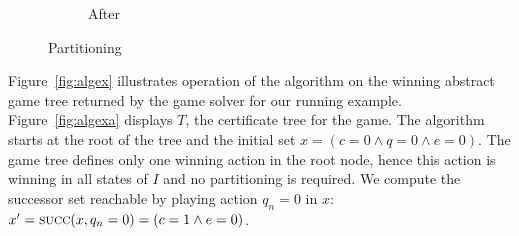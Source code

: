 \begin{figure}[b]
\begin{subfigure}[t]{.3\textwidth}
\begin{minipage}[t][3cm][t]{\textwidth}
        \end{minipage}
        \caption{After}
    \end{subfigure}%
    \hspace*{\fill}
    \caption{Partitioning}
    \label{fig:partition}
\end{figure}

Figure~\ref{fig:algex} illustrates operation of the algorithm on the winning abstract game tree returned by the game solver for our running example.  Figure~\ref{fig:algexa} displays $T$, the certificate tree for the game. The algorithm starts at the root of the tree and the initial set $x = (c = 0 \land q = 0 \land e = 0)$.  The game tree defines only one winning action in the root node, hence this action is winning in all states of $I$ and no partitioning is required.  We compute the successor set reachable by playing action $q_n = 0$ in $x$: $x' = \textsc{succ}(x, q_n = 0) = (c = 1 \land e = 0) $.

